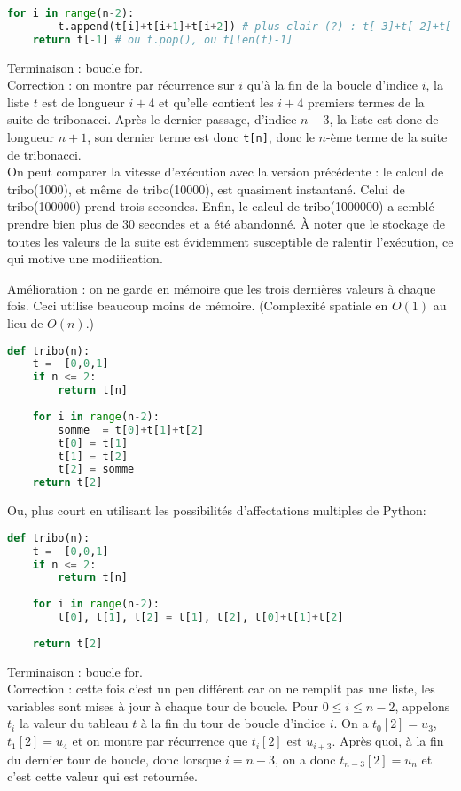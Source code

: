 \documentclass[11pt,a4paper]{article}
\begin{document}
\begin{enumerate}
\begin{lstlisting}[language=Python]
	for i in range(n-2):
		t.append(t[i]+t[i+1]+t[i+2]) # plus clair (?) : t[-3]+t[-2]+t[-1]
	return t[-1] # ou t.pop(), ou t[len(t)-1]
\end{lstlisting}
Terminaison : boucle for.\\
Correction : on montre par récurrence sur $i$ qu'à la fin de la boucle d'indice $i$, la liste $t$ est de longueur $i+4$ et qu'elle contient les $i+4$ premiers termes de la suite de tribonacci. Après le dernier passage, d'indice $n-3$, la liste est donc de longueur $n+1$, son dernier terme est donc \verb+t[n]+, donc le $n$-ème terme de la suite de tribonacci.\\

On peut comparer la vitesse d'exécution avec la version précédente : le calcul de tribo(1000), et même de tribo(10000), est quasiment instantané. Celui de tribo(100000) prend trois secondes. Enfin, le calcul de tribo(1000000) a semblé prendre bien plus de 30 secondes et a été abandonné. 
À noter que le stockage de toutes les valeurs de la suite est évidemment susceptible de ralentir l'exécution, ce qui motive une modification.

Amélioration : on ne garde en mémoire que les trois dernières valeurs à chaque fois. Ceci utilise beaucoup moins de mémoire. (Complexité spatiale en $O(1)$ au lieu de $O(n)$.)
\begin{lstlisting}[language=Python]
def tribo(n):
	t =  [0,0,1]
	if n <= 2:
		return t[n]
		
	for i in range(n-2):
		somme  = t[0]+t[1]+t[2]
		t[0] = t[1]
		t[1] = t[2]
		t[2] = somme
	return t[2]
\end{lstlisting}

Ou, plus court en utilisant les possibilités d'affectations multiples de Python:
\begin{lstlisting}[language=Python]
def tribo(n):
	t =  [0,0,1]
	if n <= 2:
		return t[n]
		
	for i in range(n-2):
		t[0], t[1], t[2] = t[1], t[2], t[0]+t[1]+t[2]
		
	return t[2]
\end{lstlisting}

Terminaison : boucle for.\\
Correction : cette fois c'est un peu différent car on ne remplit pas une liste, les variables sont mises à jour à chaque tour de boucle.
Pour $0\leq i\leq n-2$, appelons $t_i$ la valeur du tableau $t$ à la fin du tour de boucle d'indice $i$. On a $t_0[2] = u_{3}$, $t_1[2] = u_{4}$ et on montre par récurrence que $t_i[2]$ est $u_{i+3}$. Après quoi, à la fin du dernier tour de boucle, donc lorsque $i=n-3$, on a donc $t_{n-3}[2] = u_{n}$ et c'est cette valeur qui est retournée.\\


\end{enumerate}
\end{document}
